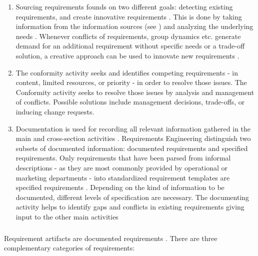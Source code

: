 \begin{enumerate}
    \item Sourcing requirements founds on two different goals: detecting existing requirements, and create innovative requirements \parencite[cf.][318, 321]{Pohl.2007}. This is done by taking information from the information sources (see ) and analyzing the underlying needs \parencite[cf.][75-76]{Sommerville.2000}. Whenever conflicts of requirements, group dynamics etc. generate demand for an additional requirement without specific needs or a trade-off solution, a creative approach can be used to innovate new requirements \parencite[cf.][94]{Lauesen.2008}. 
    \item The conformity activity seeks and identifies competing requirements - in content, limited resources, or priority - in order to resolve those issues. The Conformity activity seeks to resolve those issues by analysis and management of conflicts. Possible solutions include management decisions, trade-offs, or inducing change requests. \parencite[cf.][393]{Pohl.2007}
    \item{Documentation} is used for recording all relevant information gathered in the main and cross-section activities \parencite[cf.][217]{Pohl.2007}. Requirements Engineering distinguish two subsets of documented information: documented requirements and specified requirements. Only requirements that have been parsed from informal descriptions - as they are most commonly provided by operational or marketing departments - into standardized requirement templates are specified requirements \parencite[cf.][101]{Ebert.2014}. Depending on the kind of information to be documented, different levels of specification are necessary. The documenting activity helps to identify gaps and conflicts in existing requirements giving input to the other main activities \parencite[212]{Pohl.2007}
\end{enumerate}

\subparagraph{} Requirement artifacts are documented requirements \parencite[85]{Pohl.2007}. There are three complementary categories of requirements: 


